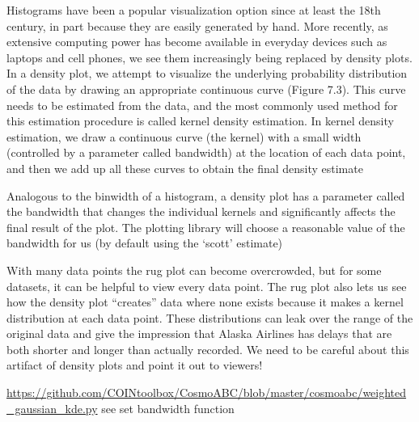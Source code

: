 Histograms have been a popular visualization option since at least the 18th century, in part because they are easily generated by hand. More recently, as extensive computing power has become available in everyday devices such as laptops and cell phones, we see them increasingly being replaced by density plots. In a density plot, we attempt to visualize the underlying probability distribution of the data by drawing an appropriate continuous curve (Figure 7.3). This curve needs to be estimated from the data, and the most commonly used method for this estimation procedure is called kernel density estimation. In kernel density estimation, we draw a continuous curve (the kernel) with a small width (controlled by a parameter called bandwidth) at the location of each data point, and then we add up all these curves to obtain the final density estimate

Analogous to the binwidth of a histogram, a density plot has a parameter called the bandwidth that changes the individual kernels and significantly affects the final result of the plot. The plotting library will choose a reasonable value of the bandwidth for us (by default using the ‘scott’ estimate)

With many data points the rug plot can become overcrowded, but for some datasets, it can be helpful to view every data point. The rug plot also lets us see how the density plot “creates” data where none exists because it makes a kernel distribution at each data point. These distributions can leak over the range of the original data and give the impression that Alaska Airlines has delays that are both shorter and longer than actually recorded. We need to be careful about this artifact of density plots and point it out to viewers!


\url{https://github.com/COINtoolbox/CosmoABC/blob/master/cosmoabc/weighted_gaussian_kde.py} see set bandwidth function 